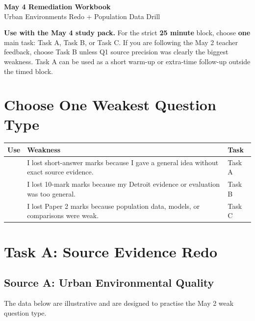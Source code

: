 \documentclass[11pt,a4paper]{article}
\newcommand{\term}[1]{\textcolor{HeadingBlue}{\textbf{#1}}}
\newcommand{\todobox}{\fbox{\rule{0pt}{0.8em}\rule{0.8em}{0pt}}}
\newcommand{\boxnote}[3]{%
\noindent\colorbox{#1}{%
  \begin{minipage}{0.965\textwidth}
  \sffamily
  \textbf{\textcolor{HeadingBlue}{#2}} #3
  \end{minipage}
}}
\begin{document}
\begin{center}
  {\sffamily\bfseries\color{HeadingBlue}\LARGE May 4 Remediation Workbook}\\[0.25em]
  {\sffamily\color{AccentTeal}\large Urban Environments Redo + Population Data Drill}
\end{center}

\boxnote{SoftBlue}{Use with the May 4 study pack.}{For the strict
\term{25 minute} block, choose \term{one} main task: Task A, Task B, or Task C.
If you are following the May 2 teacher feedback, choose Task B unless Q1 source
precision was clearly the biggest weakness. Task A can be used as a short
warm-up or extra-time follow-up outside the timed block.}

\section{Choose One Weakest Question Type}

\begin{tabularx}{\textwidth}{L{0.11\textwidth}Y L{0.24\textwidth}}
\toprule
\textbf{Use} & \textbf{Weakness} & \textbf{Task} \\
\midrule
\todobox & I lost short-answer marks because I gave a general idea without
exact source evidence. & Task A \\
\todobox & I lost 10-mark marks because my Detroit evidence or evaluation was
too general. & Task B \\
\todobox & I lost Paper 2 marks because population data, models, or comparisons
were weak. & Task C \\
\bottomrule
\end{tabularx}

\section{Task A: Source Evidence Redo}

\subsection{Source A: Urban Environmental Quality}

The data below are illustrative and are designed to practise the May 2 weak
question type.
\end{document}
